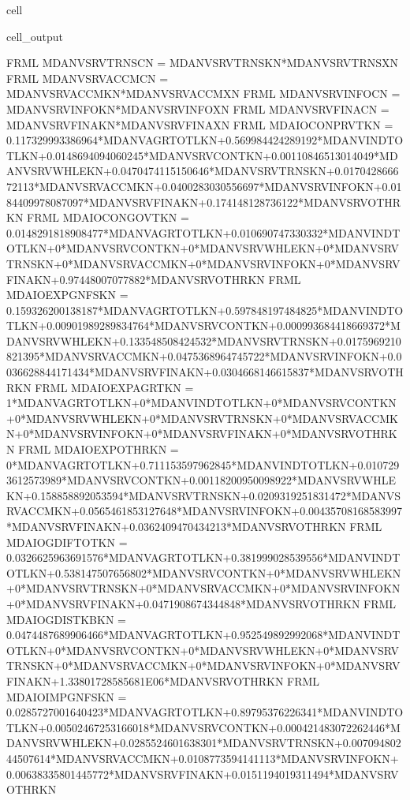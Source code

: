 \documentclass[letterpaper,10pt,english]{jupyterBook}
\begin{document}
\begin{sphinxuseclass}{cell}
\begin{sphinxVerbatimOutput}
\begin{sphinxuseclass}{cell_output}
\begin{sphinxVerbatim}[commandchars=\\\{\}]
FRML  \PYGZlt{}\PYGZgt{} MDANVSRVTRNSCN = MDANVSRVTRNSKN*MDANVSRVTRNSXN \PYGZdl{}
FRML  \PYGZlt{}\PYGZgt{} MDANVSRVACCMCN = MDANVSRVACCMKN*MDANVSRVACCMXN \PYGZdl{}
FRML  \PYGZlt{}\PYGZgt{} MDANVSRVINFOCN = MDANVSRVINFOKN*MDANVSRVINFOXN \PYGZdl{}
FRML  \PYGZlt{}\PYGZgt{} MDANVSRVFINACN = MDANVSRVFINAKN*MDANVSRVFINAXN \PYGZdl{}
FRML  \PYGZlt{}\PYGZgt{} MDAIOCONPRVTKN = 0.117329993386964*MDANVAGRTOTLKN+0.569984424289192*MDANVINDTOTLKN+0.0148694094060245*MDANVSRVCONTKN+0.00110846513014049*MDANVSRVWHLEKN+0.0470474115150646*MDANVSRVTRNSKN+0.017042866672113*MDANVSRVACCMKN+0.0400283030556697*MDANVSRVINFOKN+0.0184409978087097*MDANVSRVFINAKN+0.174148128736122*MDANVSRVOTHRKN \PYGZdl{}
FRML  \PYGZlt{}\PYGZgt{} MDAIOCONGOVTKN = 0.0148291818908477*MDANVAGRTOTLKN+0.010690747330332*MDANVINDTOTLKN+0*MDANVSRVCONTKN+0*MDANVSRVWHLEKN+0*MDANVSRVTRNSKN+0*MDANVSRVACCMKN+0*MDANVSRVINFOKN+0*MDANVSRVFINAKN+0.97448007077882*MDANVSRVOTHRKN \PYGZdl{}
FRML  \PYGZlt{}\PYGZgt{} MDAIOEXPGNFSKN = 0.159326200138187*MDANVAGRTOTLKN+0.597848197484825*MDANVINDTOTLKN+0.00901989289834764*MDANVSRVCONTKN+0.000993684418669372*MDANVSRVWHLEKN+0.133548508424532*MDANVSRVTRNSKN+0.0175969210821395*MDANVSRVACCMKN+0.0475368964745722*MDANVSRVINFOKN+0.0036628844171434*MDANVSRVFINAKN+0.0304668146615837*MDANVSRVOTHRKN \PYGZdl{}
FRML  \PYGZlt{}\PYGZgt{} MDAIOEXPAGRTKN = 1*MDANVAGRTOTLKN+0*MDANVINDTOTLKN+0*MDANVSRVCONTKN+0*MDANVSRVWHLEKN+0*MDANVSRVTRNSKN+0*MDANVSRVACCMKN+0*MDANVSRVINFOKN+0*MDANVSRVFINAKN+0*MDANVSRVOTHRKN \PYGZdl{}
FRML  \PYGZlt{}\PYGZgt{} MDAIOEXPOTHRKN = 0*MDANVAGRTOTLKN+0.711153597962845*MDANVINDTOTLKN+0.0107293612573989*MDANVSRVCONTKN+0.00118200950098922*MDANVSRVWHLEKN+0.158858892053594*MDANVSRVTRNSKN+0.0209319251831472*MDANVSRVACCMKN+0.0565461853127648*MDANVSRVINFOKN+0.00435708168583997*MDANVSRVFINAKN+0.0362409470434213*MDANVSRVOTHRKN \PYGZdl{}
FRML  \PYGZlt{}\PYGZgt{} MDAIOGDIFTOTKN = 0.0326625963691576*MDANVAGRTOTLKN+0.381999028539556*MDANVINDTOTLKN+0.538147507656802*MDANVSRVCONTKN+0*MDANVSRVWHLEKN+0*MDANVSRVTRNSKN+0*MDANVSRVACCMKN+0*MDANVSRVINFOKN+0*MDANVSRVFINAKN+0.0471908674344848*MDANVSRVOTHRKN \PYGZdl{}
FRML  \PYGZlt{}\PYGZgt{} MDAIOGDISTKBKN = 0.0474487689906466*MDANVAGRTOTLKN+0.952549892992068*MDANVINDTOTLKN+0*MDANVSRVCONTKN+0*MDANVSRVWHLEKN+0*MDANVSRVTRNSKN+0*MDANVSRVACCMKN+0*MDANVSRVINFOKN+0*MDANVSRVFINAKN+1.33801728585681E\PYGZhy{}06*MDANVSRVOTHRKN \PYGZdl{}
FRML  \PYGZlt{}\PYGZgt{} MDAIOIMPGNFSKN = 0.0285727001640423*MDANVAGRTOTLKN+0.89795376226341*MDANVINDTOTLKN+0.00502467253166018*MDANVSRVCONTKN+0.000421483072262446*MDANVSRVWHLEKN+0.0285524601638301*MDANVSRVTRNSKN+0.00709480244507614*MDANVSRVACCMKN+0.0108773594141113*MDANVSRVINFOKN+0.00638335801445772*MDANVSRVFINAKN+0.0151194019311494*MDANVSRVOTHRKN \PYGZdl{}

\end{sphinxVerbatim}
\end{sphinxuseclass}
\end{sphinxVerbatimOutput}
\end{sphinxuseclass}
\end{document}
